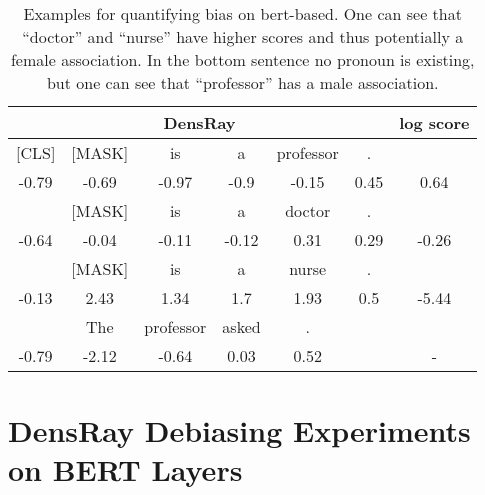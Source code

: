 \documentclass[11pt,a4paper]{article}
\def\tablabel#1{\label{tab:#1}\label{p:#1}}
\begin{document}

\begin{table}[ht]
	\centering
	\scriptsize
	\begin{tabular}{ccccccc}
		\hline
\multicolumn{6}{c|}{DensRay}&log score\\		
\hline
[CLS] &[MASK] &is &a& professor &.&\\
-0.79 &-0.69 &-0.97 &-0.9  &-0.15  &0.45&0.64\\
\hline
[CLS] &[MASK] &is &a& doctor &.&\\
-0.64 &-0.04 &-0.11 &-0.12  &0.31  &0.29 &-0.26\\
\hline
[CLS] &[MASK] &is &a& nurse &.&\\
-0.13  &2.43  &1.34  &1.7   &1.93  &0.5 &-5.44\\
\hline
[CLS] &The &professor &asked &.&&\\
-0.79 &-2.12 &-0.64 & 0.03&  0.52&&-\\

		\hline
	\end{tabular}
	\caption{\tablabel{t:measure1}
		Examples for quantifying bias on bert-based. One can see that ``doctor'' and ``nurse'' have higher scores and thus potentially a female association. In the bottom sentence no pronoun is existing, but one can see that ``professor'' has a male association.}
\end{table}

\section{DensRay Debiasing Experiments on BERT Layers}

\end{document}
